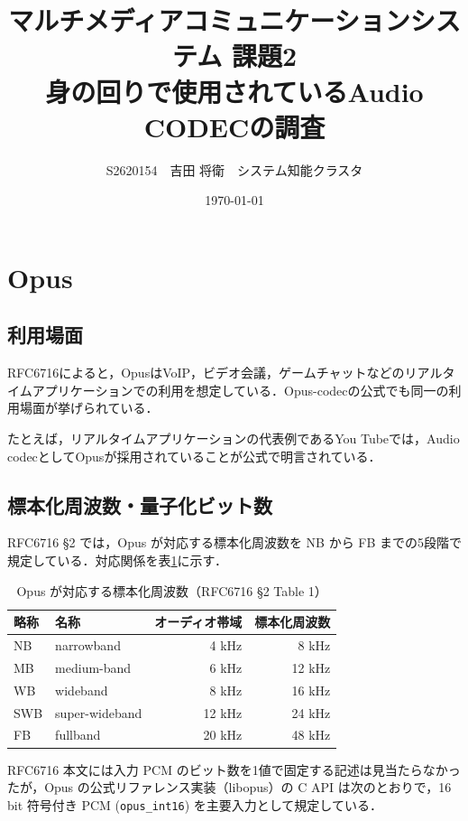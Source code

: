 \documentclass[a4paper,12pt]{article}
\title{マルチメディアコミュニケーションシステム 課題2\\
{\normalsize 身の回りで使用されているAudio CODECの調査}}
\author{S2620154　吉田 将衛　システム知能クラスタ}
\date{\today}
\begin{document}
\maketitle

\section{Opus}

\subsection{利用場面}

RFC6716によると，OpusはVoIP，ビデオ会議，ゲームチャットなどのリアルタイムアプリケーションでの利用を想定している\cite{opus-rfc6716}．Opus-codecの公式でも同一の利用場面が挙げられている\cite{opus-codec-site}．

たとえば，リアルタイムアプリケーションの代表例であるYou Tubeでは，Audio codecとしてOpusが採用されていることが公式で明言されている\cite{youtube-recommended-settings}．

\subsection{標本化周波数・量子化ビット数}

RFC6716 §2 では，Opus が対応する標本化周波数を NB から FB までの5段階で規定している\cite{opus-rfc6716}．対応関係を表\ref{tab:opus-sampling}に示す．

\begin{table}[h]
  \centering
  \caption{Opus が対応する標本化周波数（RFC6716 §2 Table 1）}
  \label{tab:opus-sampling}
  \begin{tabular}{llrr}
    \toprule
    略称 & 名称 & オーディオ帯域 & 標本化周波数 \\
    \midrule
    NB  & narrowband      &  4 kHz &  8 kHz \\
    MB  & medium-band     &  6 kHz & 12 kHz \\
    WB  & wideband        &  8 kHz & 16 kHz \\
    SWB & super-wideband  & 12 kHz & 24 kHz \\
    FB  & fullband        & 20 kHz & 48 kHz \\
    \bottomrule
  \end{tabular}
\end{table}

RFC6716 本文には入力 PCM のビット数を1値で固定する記述は見当たらなかったが，Opus の公式リファレンス実装（libopus）の C API は次のとおりで，16 bit 符号付き PCM (\texttt{opus\_int16}) を主要入力として規定している\cite{opus-api-encoder}．
\end{document}
